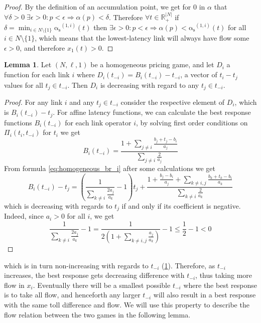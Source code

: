 \documentclass[10pt,a4paper]{book}
\newcommand{\as}{\mathrm{\alpha_s}}
\newcommand{\R}{\mathbb{R}}
\theoremstyle{definition}
\newtheorem{lemma}[definition]{Lemma}
\theoremstyle{comment}
\begin{document}
\begin{proof}
	By the definition of an accumulation point, we get for $0$ in $\alpha$ that $\forall \delta > 0 \; \exists \epsilon > 0: p < \epsilon \Rightarrow \alpha(p) < \delta$.
	Therefore $\forall t \in \R_+^{|N|}$ if $\delta = \min_{i \in N \setminus \{1\}}\as^{(1, i)}(t)$ then $\exists \epsilon > 0: p < \epsilon \Rightarrow \alpha(p) < \as^{(1, i)}(t)$ for all $i \in N \setminus \{1\}$, which means that the lowest-latency link will always have flow some $\epsilon > 0$, and therefore $x_1(t) > 0$.
\end{proof}

\begin{lemma}
	\label{lemma:tolls_diff}
	Let $(N, \ell, 1)$ be a homogeneous pricing game, and let $D_i$ a function for each link $i$ where $D_i(t_{-i}) = B_i(t_{-i}) - t_{-i}$, a vector of $t_i - t_j$ values for all $t_j \in t_{-i}$.
	Then $D_i$ is decreasing with regard to any $t_j \in t_{-i}$.
\end{lemma}

\begin{proof}
	For any link $i$ and any $t_j \in t_{-i}$ consider the respective element of $D_i$, which is $B_i(t_{-i}) - t_j$.
	For affine latency functions, we can calculate the best response functions $B_i(t_{-i})$ for each link operator $i$, by solving first order conditions on $\Pi_i(t_i, t_{-i})$ for $t_i$ we get
	\begin{equation}
		\label{eq:homogeneous_br_i}
		B_i(t_{-i}) = \frac{1 + \sum_{j \ne i}\frac{b_j + t_j - b_i}{a_j}}{\sum_{j \ne i}\frac{2}{a_j}}
	\end{equation}
	From formula \ref{eq:homogeneous_br_i} after some calculations we get
	\[
		B_i(t_{-i}) - t_j = \left(\frac{1}{\sum_{k \ne i} \frac{2a_j}{a_k}} - 1\right)t_j + \frac{1 + \frac{b_j - b_i}{a_j} + \sum_{k \ne i, j}\frac{b_k + t_k - b_i}{a_k}}{\sum_{k \ne i} \frac{2}{a_k}}
	\]
	which is decreasing with regards to $t_j$ if and only if its coefficient is negative.
	Indeed, since $a_i > 0$ for all $i$, we get
	\[
		\frac{1}{\sum_{k \ne i} \frac{2a_j}{a_k}} - 1 = \frac{1}{2 \left(1 + \sum_{k \ne i, j} \frac{a_j}{a_k}\right)} - 1 \leq \frac{1}{2} - 1 < 0
	\]
\end{proof}

which is in turn non-increasing with regards to $t_{-i}$ (\ref{lemma:tolls_diff}).
Therefore, as $t_{-i}$ increases, the best response gets decreasing difference with $t_{-i}$, thus taking more flow in $x_i$.
Eventually there will be a smallest possible $t_{-i}$ where the best response is to take all flow, and henceforth any larger $t_{-i}$ will also result in a best response with the same toll difference and flow.
We will use this property to describe the flow relation between the two games in the following lemma.
\end{document}
